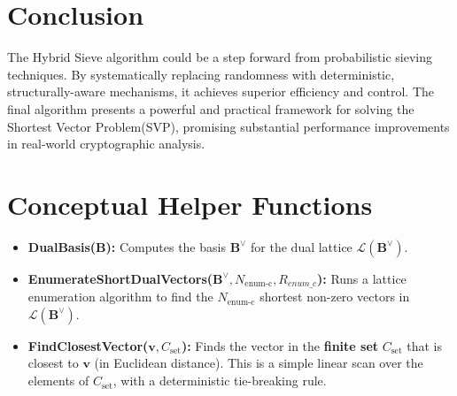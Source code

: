 \documentclass{article}
\begin{document}
\section{Conclusion}

The Hybrid Sieve algorithm could be a step forward from probabilistic sieving techniques. By systematically replacing randomness with 
deterministic, structurally-aware mechanisms, it achieves superior efficiency and control. The final algorithm presents a powerful and 
practical framework for solving the Shortest Vector Problem(SVP), promising substantial performance improvements in real-world cryptographic 
analysis.

\appendix
\section{Conceptual Helper Functions}
\begin{itemize}
    \item \textbf{DualBasis($\mathbf{B}$):} Computes the basis $\mathbf{B}^{\vee}$ for the dual lattice $\mathcal{L}(\mathbf{B}^{\vee})$.
    \item \textbf{EnumerateShortDualVectors($\mathbf{B}^{\vee}, N_{\text{enum-c}}, R_{enum\_c}$):} Runs a lattice enumeration algorithm to find the $N_{\text{enum-c}}$ shortest non-zero vectors in $\mathcal{L}(\mathbf{B}^{\vee})$.
    \item \textbf{FindClosestVector($\mathbf{v}, C_{\text{set}}$):} Finds the vector in the \textbf{finite set} $C_{\text{set}}$ that is closest to $\mathbf{v}$ (in Euclidean distance). This is a simple linear scan over the elements of $C_{\text{set}}$, with a deterministic tie-breaking rule.
\end{itemize}
\end{document}
